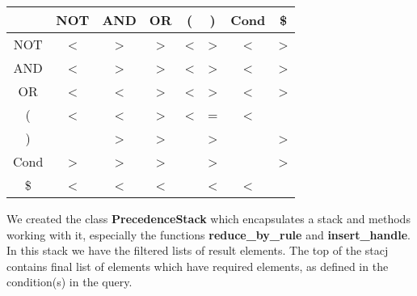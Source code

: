 \documentclass[10pt,a4paper]{article}
\begin{document}
	        \begin{center}
		\begin{tabular}{ |c|c|c|c|c|c|c|c| } 
		\hline
		& NOT & AND & OR & ( & ) & Cond & \$\\
		\hline
		NOT & < & > & > & < & > & < & > \\
		\hline
		AND & < & > & > & < & > & < & > \\
		\hline
		OR & < & < & > & < & > & < & > \\
		\hline
		( & < & < & > & < & = & < &  \\
		\hline
		) &  & > & > &  & > &  & >\\
		\hline
		Cond & > & > & > &  & > &  & >\\
		\hline
		\$ & < & < & < &  & < & < &  \\
		\hline
		\end{tabular}
		\end{center}
		
		We created the class \textbf{PrecedenceStack} which encapsulates a stack and methods working with it, especially the functions \textbf{reduce\_by\_rule} and \textbf{insert\_handle}. In this stack we have the filtered lists of result elements. The top of the stacj contains final list of elements which have required elements, as defined in the condition(s) in the query.
\end{document}
